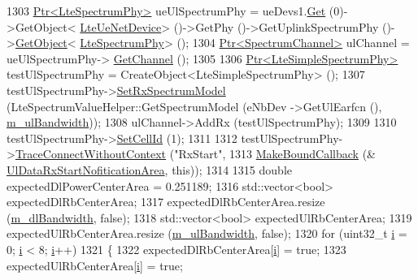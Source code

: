 \begin{DoxyCode}
1303   \hyperlink{classns3_1_1Ptr}{Ptr<LteSpectrumPhy>} ueUlSpectrumPhy = ueDevs1.\hyperlink{classns3_1_1NetDeviceContainer_a677d62594b5c9d2dea155cc5045f4d0b}{Get} (0)->GetObject<
      \hyperlink{classns3_1_1LteUeNetDevice}{LteUeNetDevice}> ()->GetPhy ()->GetUplinkSpectrumPhy ()->\hyperlink{classns3_1_1Object_a13e18c00017096c8381eb651d5bd0783}{GetObject}<
      \hyperlink{classns3_1_1LteSpectrumPhy}{LteSpectrumPhy}> ();
1304   \hyperlink{classns3_1_1Ptr}{Ptr<SpectrumChannel>} ulChannel = ueUlSpectrumPhy->
      \hyperlink{classns3_1_1LteSpectrumPhy_a50f13e43568687ee32c5d63e5bf639c2}{GetChannel} ();
1305 
1306   \hyperlink{classns3_1_1Ptr}{Ptr<LteSimpleSpectrumPhy>} testUlSpectrumPhy = CreateObject<LteSimpleSpectrumPhy>
       ();
1307   testUlSpectrumPhy->\hyperlink{classns3_1_1LteSimpleSpectrumPhy_a1cbc14b5951a6c9360d3b180760429d9}{SetRxSpectrumModel} (LteSpectrumValueHelper::GetSpectrumModel (eNbDev
      ->GetUlEarfcn (), \hyperlink{classLteFrAreaTestCase_afa54487d9f12658bbead39e1272f4d8c}{m\_ulBandwidth}));
1308   ulChannel->AddRx (testUlSpectrumPhy);
1309 
1310   testUlSpectrumPhy->\hyperlink{classns3_1_1LteSimpleSpectrumPhy_aed3e4883b1f03358a744746b08fbd5d8}{SetCellId} (1);
1311 
1312   testUlSpectrumPhy->\hyperlink{classns3_1_1ObjectBase_a1be45f6fd561e75dcac9dfa81b2b81e4}{TraceConnectWithoutContext} (\textcolor{stringliteral}{"RxStart"},
1313                                                  \hyperlink{group__makeboundcallback_ga1725d6362e6065faa0709f7c93f8d770}{MakeBoundCallback} (&
      \hyperlink{lte-test-frequency-reuse_8cc_a1011b9d239710e3f627e9aada5d64778}{UlDataRxStartNofiticationArea}, \textcolor{keyword}{this}));
1314 
1315   \textcolor{keywordtype}{double} expectedDlPowerCenterArea = 0.251189;
1316   std::vector<bool> expectedDlRbCenterArea;
1317   expectedDlRbCenterArea.resize (\hyperlink{classLteFrAreaTestCase_a645fc2cea287afbd373f6d702152cf47}{m\_dlBandwidth}, \textcolor{keyword}{false});
1318   std::vector<bool> expectedUlRbCenterArea;
1319   expectedUlRbCenterArea.resize (\hyperlink{classLteFrAreaTestCase_afa54487d9f12658bbead39e1272f4d8c}{m\_ulBandwidth}, \textcolor{keyword}{false});
1320   \textcolor{keywordflow}{for} (uint32\_t \hyperlink{bernuolliDistribution_8m_a6f6ccfcf58b31cb6412107d9d5281426}{i} = 0; \hyperlink{bernuolliDistribution_8m_a6f6ccfcf58b31cb6412107d9d5281426}{i} < 8; \hyperlink{bernuolliDistribution_8m_a6f6ccfcf58b31cb6412107d9d5281426}{i}++)
1321     \{
1322       expectedDlRbCenterArea[\hyperlink{bernuolliDistribution_8m_a6f6ccfcf58b31cb6412107d9d5281426}{i}] = \textcolor{keyword}{true};
1323       expectedUlRbCenterArea[\hyperlink{bernuolliDistribution_8m_a6f6ccfcf58b31cb6412107d9d5281426}{i}] = \textcolor{keyword}{true};

\end{DoxyCode}

